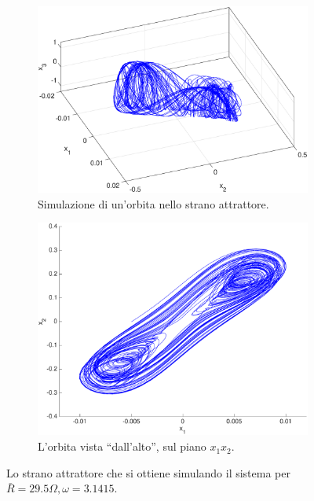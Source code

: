 \begin{figure}
    \centering
    \begin{subfigure}{\textwidth}
        \includegraphics[width=\textwidth]{matcont/StranoAttrattore}
        \caption{Simulazione di un'orbita nello strano attrattore.}
    \end{subfigure}
    \par\bigskip
    \begin{subfigure}{0.85\textwidth}
        \includegraphics[width=\textwidth]{matcont/StranoAttrattore2D}
        \caption{L'orbita vista ``dall'alto'', sul piano $x_1 x_2$.}
    \end{subfigure}
    \caption{Lo strano attrattore che si ottiene simulando il sistema per $\bar{R}=29.5 \Omega, \omega = 3.1415$.}
    \label{fig:strano-attrattore}
\end{figure}

